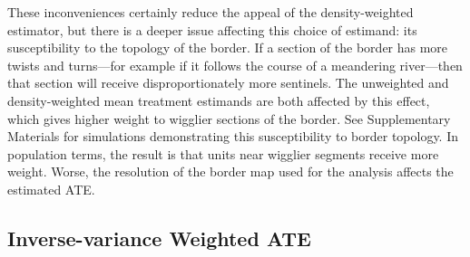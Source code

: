 \documentclass[letter,12pt]{article}
\begin{document}
These inconveniences certainly reduce the appeal of the density-weighted estimator,
but there is a deeper issue affecting this choice of estimand: its susceptibility to the topology of the border.
If a section of the border has more twists and turns---for example if it follows the course of a meandering river---then that section will receive disproportionately more sentinels.
The unweighted and density-weighted mean treatment estimands are both affected by this effect,
which gives higher weight to wigglier sections of the border.
See Supplementary Materials for simulations demonstrating this susceptibility to border topology.
In population terms, the result is that units near wigglier segments receive more weight.
Worse, the resolution of the border map used for the analysis affects the estimated ATE.


\hypertarget{inverse-variance-weighted-ate}{%
\subsection{Inverse-variance Weighted ATE}\label{inverse-variance-weighted-ate}}

\label{sec:invvar}

\end{document}
